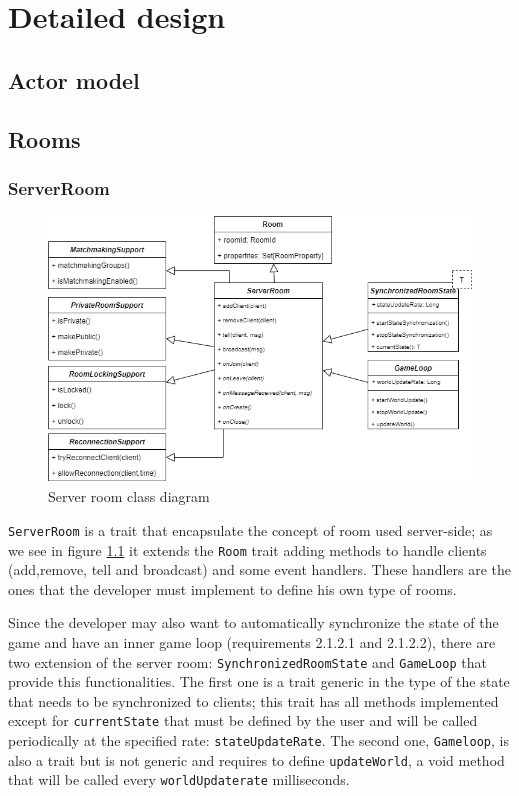 \chapter{Detailed design}

\section{Actor model}

\section{Rooms}

\subsection{ServerRoom}
\begin{figure}[H]
	\centering
	\includegraphics[scale=0.5]{images/4-design/server-room.png}
	\caption{Server room class diagram}
	\label{fig:server_room_class_diagram}
\end{figure}
\texttt{ServerRoom} is a trait that encapsulate the concept of room used server-side; as we see in figure \ref{fig:server_room_class_diagram} it extends the \texttt{Room} trait adding methods to handle clients (add,remove, tell and broadcast) and some event handlers. These handlers are the ones that the developer must implement to define his own type of rooms.

Since the developer may also want to automatically synchronize the state of the game and have an inner game loop (requirements 2.1.2.1 and 2.1.2.2), there are two extension of the server room: \texttt{SynchronizedRoomState} and \texttt{GameLoop} that provide this functionalities. The first one is a trait generic in the type of the state that needs to be synchronized to clients; this trait has all methods implemented except for \texttt{currentState} that must be defined by the user and will be called periodically at the specified rate: \texttt{stateUpdateRate}.
The second one, \texttt{Gameloop}, is also a trait but is not generic and requires to define \texttt{updateWorld}, a void method that will be called every \texttt{worldUpdaterate} milliseconds.

